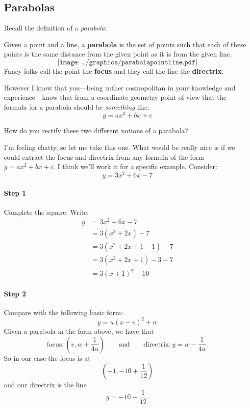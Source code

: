 \subsection{Parabolas}


Recall the definition of a \textit{parabola}:
\begin{definition} 
Given a point and a line, a \textbf{parabola} is the
set of points such that each of these points is the same distance from
the given point as it is from the given line.
\[
\texttt{[image: ../graphics/parabolapointline.pdf]}
\]
Fancy folks call the point the \textbf{focus} and they call the line the
\textbf{directrix}.
\end{definition}

However I know that you---being rather cosmopolitan in your knowledge
and experience---know that from a coordinate geometry point of view
that the formula for a parabola should be \textit{something} like:
\[
y = ax^2 + bx + c
\]
\begin{question}
How do you rectify these two different notions of a parabola?
\end{question}
I'm feeling chatty, so let me take this one. What would be really nice
is if we could extract the focus and directrix from any formula of the
form $y = ax^2 + bx + c$. I think we'll work it for a specific
example. Consider:
\[
y = 3x^2 + 6x - 7
\]
\paragraph{Step 1} Complete the square. Write:
\begin{align*}
y &= 3x^2 + 6x -7 \\
 &= 3(x^2 + 2x) -7 \\ 
 &= 3(x^2 + 2x + 1 - 1) -7 \\
 &= 3(x^2 + 2x + 1) - 3 -7\\ 
 &= 3(x + 1)^2 - 10
\end{align*}


\paragraph{Step 2} Compare with the following basic form:
\[
y = u(x-v)^2 +w 
\]
Given a parabola in the form above, we have that
\[
\text{focus}:\left(v, w+\frac{1}{4u}\right) \qquad\text{and}\qquad \text{directrix}:y = w - \frac{1}{4u}.
\]
So in our case the focus is at 
\[
\left(-1, -10 + \frac{1}{12}\right)
\]
and our directrix is the line
\[
y = -10-\frac{1}{12}.
\]

